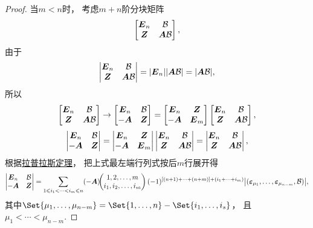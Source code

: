 \begin{theorem}
\begin{proof}
当\(m<n\)时，
考虑\(m+n\)阶分块矩阵\[
	\begin{bmatrix}
		\E_n & \B \\
		\z & \A\B
	\end{bmatrix},
\]
由于\[
	\begin{vmatrix}
		\E_n & \B \\
		\z & \A\B
	\end{vmatrix}
	= \abs{\E_n} \abs{\A\B}
	= \abs{\A\B},
\]
所以\[
	\begin{bmatrix}
		\E_n & \B \\
		\z & \A\B
	\end{bmatrix}
	\to
	\begin{bmatrix}
		\E_n & \B \\
		-\A & \z
	\end{bmatrix}
	= \begin{bmatrix}
		\E_n & \z \\
		-\A & \E_m
	\end{bmatrix} \begin{bmatrix}
		\E_n & \B \\
		\z & \A\B
	\end{bmatrix},
\]\[
	\begin{vmatrix}
		\E_n & \B \\
		-\A & \z
	\end{vmatrix}
	= \begin{vmatrix}
		\E_n & \z \\
		-\A & \E_m
	\end{vmatrix} \begin{vmatrix}
		\E_n & \B \\
		\z & \A\B
	\end{vmatrix}
	= \begin{vmatrix}
		\E_n & \B \\
		\z & \A\B
	\end{vmatrix},
\]
根据\hyperref[theorem:行列式.拉普拉斯定理]{拉普拉斯定理}，
把上式最左端行列式按后\(m\)行展开得\[
	\begin{vmatrix}
		\E_n & \B \\
		-\A & \z
	\end{vmatrix}
	= \sum\limits_{1 \leqslant i_1 < \dotsb < i_m \leqslant n}
	\MatrixMinor{(-\A)}{
		1,2,\dotsc,m \\
		i_1,i_2,\dotsc,i_m
	}
	(-1)^{[(n+1)+\dotsb+(n+m)]+(i_1+\dotsb+i_m)}
	\abs{(\e_{\mu_1},\dotsc,\e_{\mu_{n-m}},\B)},
\]
其中\(\Set{\mu_1,\dotsc,\mu_{n-m}}
= \Set{1,\dotsc,n}-\Set{i_1,\dotsc,i_s}\)，
且\(\mu_1<\dotsb<\mu_{n-m}\).


\end{proof}
\end{theorem}
